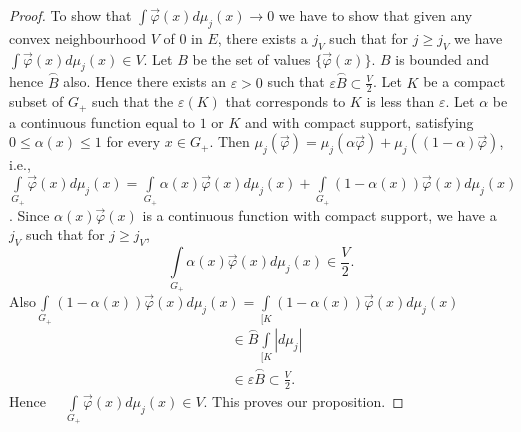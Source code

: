\begin{proof}
To show that $\int\overrightarrow{\varphi}(x) d \mu_j(x)\to 0$ we have
to show that given any convex neighbourhood $V$ of $0$ in $E$, there
exists a $j_V$ such that for $j\geq j_V$ we have
$\int\overrightarrow{\varphi} (x)d\mu_j(x)\in V$. Let $B$ be the
set of values $\{\overrightarrow{\varphi}(x)\}$. $B$ is bounded and
hence $\overset{\frown}{B}$ also. Hence there exists an $\varepsilon
>0$ such that $\varepsilon \overset{\frown}{B}\subset\frac{V}{2}$. Let
$K$ be a compact subset of $G_+$ such that the $\varepsilon(K)$ that
corresponds to $K$ is less than $\varepsilon$. Let $\alpha$ be a
continuous function equal to $1$ or $K$ and with compact support,
satisfying $0\leq\alpha(x)\leq 1$ for every $x \in G_+$. Then $\mu_j
(\overrightarrow{\varphi}) =\mu_j(\alpha\overrightarrow{\varphi})+
\mu_j ((1-\alpha)\overrightarrow{\varphi})$, i.e., $\int\limits_{G_+}
\overrightarrow{\varphi} (x)d\mu_j(x)=\int\limits_{G_+}\alpha(x)
\overrightarrow{\varphi} (x)d\mu_j(x)+\int\limits_{G_+}(1-\alpha(x))
\overrightarrow{\varphi} (x)d\mu_j(x)$. Since $\alpha(x)
\overrightarrow{\varphi} (x)$ is a continuous function with compact
support, we have a $j_V$ such that for $j\geq j_V$,
$$
\int\limits_{G_+}\alpha(x)\overrightarrow{\varphi}(x)d\mu_j(x) \in
\frac{V}{2}.
$$
Also\pageoriginale $\int\limits_{G_+}(1-\alpha(x))
\overrightarrow{\varphi}(x) d\mu_j(x)=\int\limits_{[K} (1-\alpha(x))
  \overrightarrow{\varphi} (x)d\mu_j(x)$
\begin{align*}
&\in \overset{\frown}{B} \int\limits_{[K} |d\mu_j|\\
&\in \varepsilon \overset{\frown}{B} \subset \frac{V}{2}.
\end{align*}
Hence $\quad \int\limits_{G_+}\overrightarrow{\varphi}(x)d\mu_j(x)\in
V$. This proves our proposition. 
\end{proof}
